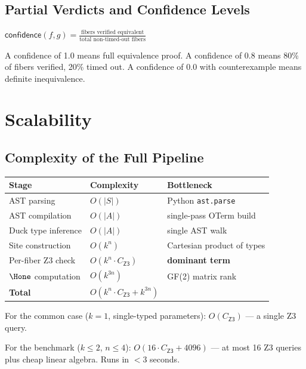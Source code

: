 \section{Partial Verdicts and Confidence Levels}

\begin{definition}
$\mathsf{confidence}(f, g) = \frac{\text{fibers verified equivalent}}
{\text{total non-timed-out fibers}}$

A confidence of 1.0 means full equivalence proof.
A confidence of 0.8 means 80\% of fibers verified, 20\% timed out.
A confidence of 0.0 with counterexample means definite inequivalence.
\end{definition}


\chapter{Scalability}
\label{ch:scalability}

\section{Complexity of the Full Pipeline}

\begin{center}
\begin{tabular}{l l l}
  \textbf{Stage} & \textbf{Complexity} & \textbf{Bottleneck} \\
  \hline
  AST parsing & $O(|S|)$ & Python \texttt{ast.parse} \\
  AST compilation & $O(|A|)$ & single-pass OTerm build \\
  Duck type inference & $O(|A|)$ & single AST walk \\
  Site construction & $O(k^n)$ & Cartesian product of types \\
  Per-fiber Z3 check & $O(k^n \cdot C_\mathsf{Z3})$ &
    \textbf{dominant term} \\
  $\Hone$ computation & $O(k^{3n})$ & GF(2) matrix rank \\
  \hline
  \textbf{Total} & $O(k^n \cdot C_\mathsf{Z3} + k^{3n})$ & \\
\end{tabular}
\end{center}

For the common case ($k = 1$, single-typed parameters):
$O(C_\mathsf{Z3})$ --- a single Z3 query.

For the benchmark ($k \leq 2$, $n \leq 4$):
$O(16 \cdot C_\mathsf{Z3} + 4096)$ --- at most 16 Z3 queries plus
cheap linear algebra.  Runs in $< 3$ seconds.

